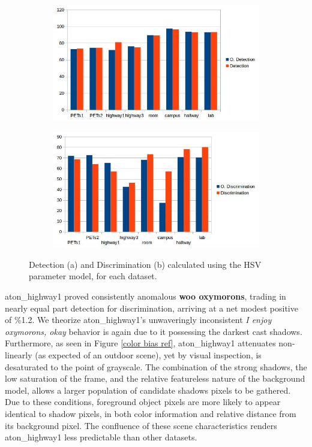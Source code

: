 \documentclass[12pt]{report}
\begin{document}
\begin{figure}
\centering
\begin{subfigure}{1\linewidth}
  \includegraphics[width=1\linewidth]{figures/model/detect_hsv.jpg}
  \caption{}
\end{subfigure}
\hfill
\begin{subfigure}{1\linewidth}
  \includegraphics[width=1\linewidth]{figures/model/discrim_hsv.jpg}
  \caption{}
\end{subfigure}

\caption{Detection (a) and Discrimination (b) calculated using the HSV parameter model, for each dataset.}
\label{fig:bars_hsv_calc}
\end{figure}

aton\_highway1 proved consistently anomalous \textbf{woo oxymorons}, trading in nearly equal part detection for discrimination, arriving at a net modest positive of \%1.2. We theorize aton\_highway1's unwaveringly inconsistent \textit{I enjoy oxymorons, okay} behavior is again due to it possessing the darkest cast shadows. Furthermore, as seen in Figure \ref{color bias ref}, aton\_highway1 attenuates non-linearly (as expected of an outdoor scene), yet by visual inspection, is desaturated to the point of grayscale. The combination of the strong shadows, the low saturation of the frame, and the relative featureless nature of the background model, allows a larger population of candidate shadows pixels to be gathered. Due to these conditions, foreground object pixels are more likely to appear identical to shadow pixels, in both color information and relative distance from its background pixel. The confluence of these scene characteristics renders aton\_highway1 less predictable than other datasets.
\end{document}
